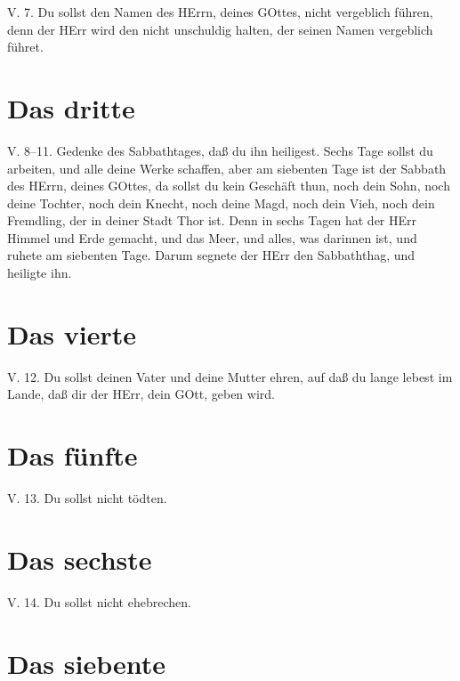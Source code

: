 \begin{schriftzitat}
V. 7. Du sollst den Namen des HErrn, deines GOttes, nicht vergeblich führen, denn der HErr wird den nicht unschuldig halten, der seinen Namen vergeblich führet.
\end{schriftzitat}

\section{Das dritte}

\begin{schriftzitat}
V. 8–11. Gedenke des Sabbathtages, daß du ihn heiligest. Sechs Tage sollst du arbeiten, und alle deine Werke schaffen, aber am siebenten Tage ist der Sabbath des HErrn, deines GOttes, da sollst du kein Geschäft thun, noch dein Sohn, noch deine Tochter, noch dein Knecht, noch deine Magd, noch dein Vieh, noch dein Fremdling, der in deiner Stadt Thor ist. Denn in sechs Tagen hat der HErr Himmel und Erde gemacht, und das Meer, und alles, was darinnen ist, und ruhete am siebenten Tage. Darum segnete der HErr den Sabbaththag, und heiligte ihn.
\end{schriftzitat}

\section{Das vierte}

\begin{schriftzitat}
V. 12. Du sollst deinen Vater und deine Mutter ehren, auf daß du lange lebest im Lande, daß dir der HErr, dein GOtt, geben wird.
\end{schriftzitat}

\section{Das fünfte}

\begin{schriftzitat}
V. 13. Du sollst nicht tödten.
\end{schriftzitat}

\section{Das sechste}

\begin{schriftzitat}
V. 14. Du sollst nicht ehebrechen.
\end{schriftzitat}

\section{Das siebente}

